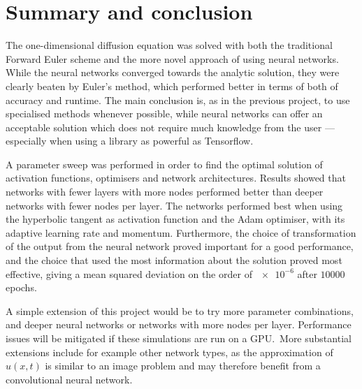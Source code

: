 \documentclass[11pt,british,a4paper]{article}
\numberwithin{equation}{section}
\begin{document}
\section{Summary and conclusion}
The one-dimensional diffusion equation was solved with both the traditional Forward Euler scheme and the more novel approach of using neural networks. While the neural networks converged towards the analytic solution, they were clearly beaten by Euler's method, which performed better in terms of both of accuracy and runtime. The main conclusion is, as in the previous project, to use specialised methods whenever possible, while neural networks can offer an acceptable solution which does not require much knowledge from the user --- especially when using a library as powerful as Tensorflow.

A parameter sweep was performed in order to find the optimal solution of activation functions, optimisers and network architectures. Results showed that networks with fewer layers with more nodes performed better than deeper networks with fewer nodes per layer. The networks performed best when using the hyperbolic tangent as activation function and the Adam optimiser, with its adaptive learning rate and momentum. Furthermore, the choice of transformation of the output from the neural network proved important for a good performance, and the choice that used the most information about the solution proved most effective, giving a mean squared deviation on the order of \(\num{e-6}\) after \(\num{10000}\) epochs.

A simple extension of this project would be to try more parameter combinations, and deeper neural networks or networks with more nodes per layer. Performance issues will be mitigated if these simulations are run on a GPU.\ More substantial extensions include for example other network types, as the approximation of \(u(x,t)\) is similar to an image problem and may therefore benefit from a convolutional neural network.



\nocite{*}
\printbibliography{}
\end{document}
